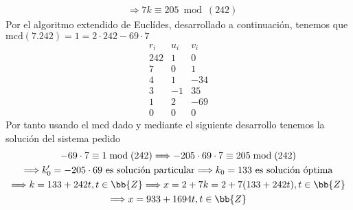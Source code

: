 \documentclass[12pt]{article}
\begin{document}
\begin{ejercicio} [1,25 puntos]
\begin{align*}
            &\Longrightarrow7k\equiv205\bmod{(242)}
        \end{align*}
        Por el algoritmo extendido de Euclídes, desarrollado a continuación, tenemos que $\text{mcd}(7.242)=1=2\cdot242-69\cdot7$
        \begin{equation*}
            \begin{array}{c|c|c}
                r_i & u_i & v_i\\ \hline
                242 & 1 & 0\\
                7 & 0 & 1 \\
                4 & 1 & -34 \\
                3 & -1 & 35 \\
                1 & 2 & -69 \\
                0 & 0 & 0
            \end{array}
        \end{equation*}
        Por tanto usando el mcd dado y mediante el siguiente desarrollo tenemos la solución del sistema pedido
        \begin{multline*}
            -69\cdot7\equiv 1\bmod{(242)}\Longrightarrow -205\cdot69\cdot7\equiv205\bmod{(242)} \\
            \Longrightarrow k_0'=-205\cdot69 \text{ es solución particular} \Longrightarrow k_0=133 \text{ es solución óptima} \\
            \Longrightarrow k=133+242t, t\in\bb{Z}\Longrightarrow x=2+7k=2+7(133+242t), t\in\bb{Z}\\
            \Longrightarrow x=933+1694t, t\in\bb{Z}
        \end{multline*}
    \end{ejercicio}
\end{document}
